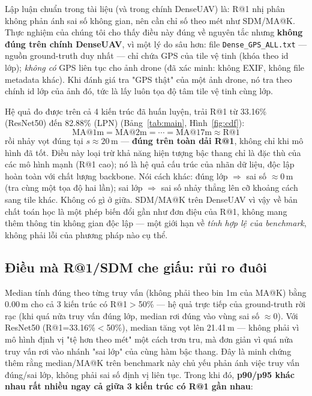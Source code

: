 \documentclass[11pt]{article}
\begin{document}
Lập luận chuẩn trong tài liệu (và trong chính DenseUAV) là: R@1 nhị phân không phản ánh sai số không gian, nên cần chỉ số theo mét như SDM/MA@K. Thực nghiệm của chúng tôi cho thấy điều này đúng về nguyên tắc nhưng \textbf{không đúng trên chính DenseUAV}, vì một lý do sâu hơn: file \texttt{Dense\_GPS\_ALL.txt} — nguồn ground-truth duy nhất — chỉ chứa GPS của tile vệ tinh (khóa theo id lớp); \emph{không có} GPS liên tục cho ảnh drone (đã xác minh: không EXIF, không file metadata khác). Khi đánh giá tra "GPS thật" của một ảnh drone, nó tra theo chính id lớp của ảnh đó, tức là lấy luôn tọa độ tâm tile vệ tinh cùng lớp.

Hệ quả đo được trên cả 4 kiến trúc đã huấn luyện, trải R@1 từ 33.16\% (ResNet50) đến 82.88\% (LPN) (Bảng~\ref{tab:main}, Hình~\ref{fig:cdf}):
$$
\text{MA@1m} = \text{MA@2m} = \cdots = \text{MA@17m} \approx \text{R@1}
$$
rồi nhảy vọt đúng tại $s\approx20$\,m — \textbf{đúng trên toàn dải R@1}, không chỉ khi mô hình đã tốt. Điều này loại trừ khả năng hiện tượng bậc thang chỉ là đặc thù của các mô hình mạnh (R@1 cao); nó là hệ quả cấu trúc của nhãn dữ liệu, độc lập hoàn toàn với chất lượng backbone. Nói cách khác: đúng lớp $\Rightarrow$ sai số $\approx0$\,m (tra cùng một tọa độ hai lần); sai lớp $\Rightarrow$ sai số nhảy thẳng lên cỡ khoảng cách sang tile khác. Không có gì ở giữa. SDM/MA@K trên DenseUAV vì vậy về bản chất toán học là một phép biến đổi gần như đơn điệu của R@1, không mang thêm thông tin không gian độc lập — một giới hạn về \emph{tính hợp lệ của benchmark}, không phải lỗi của phương pháp nào cụ thể.

\subsection{Điều mà R@1/SDM che giấu: rủi ro đuôi}

Median tính đúng theo từng truy vấn (không phải theo bin 1m của MA@K) bằng 0.00\,m cho cả 3 kiến trúc có R@1$>$50\% — hệ quả trực tiếp của ground-truth rời rạc (khi quá nửa truy vấn đúng lớp, median rơi đúng vào vùng sai số $\approx0$). Với ResNet50 (R@1=33.16\%$<$50\%), median tăng vọt lên 21.41\,m — không phải vì mô hình định vị "tệ hơn theo mét" một cách trơn tru, mà đơn giản vì quá nửa truy vấn rơi vào nhánh "sai lớp" của cùng hàm bậc thang. Đây là minh chứng thêm rằng median/MA@K trên benchmark này chủ yếu phản ánh việc truy vấn đúng/sai lớp, không phải sai số định vị liên tục. Trong khi đó, \textbf{p90/p95 khác nhau rất nhiều ngay cả giữa 3 kiến trúc có R@1 gần nhau}:
\end{document}
